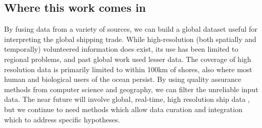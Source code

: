 \subsection{Where this work comes in}

By fusing data from a variety of sources, we can build a global dataset useful for interpreting the global shipping trade. While high-resolution (both spatially and temporally) volunteered information does exist, its use has been limited to regional problems, and past global work \citep{Corbett2007, Halpern2008} used lesser data. The coverage of high resolution data is primarily limited to within 100km of shores, also where most human and biological users of the ocean persist. %
 By using quality assurance methods from computer science and geography, %
  we can filter the unreliable input data. The near future will involve global, real-time, high resolution ship data \citep{JonesGoogle2012,carson2012satellite}, but we continue to need methods which allow data curation and integration which to address specific hypotheses.


